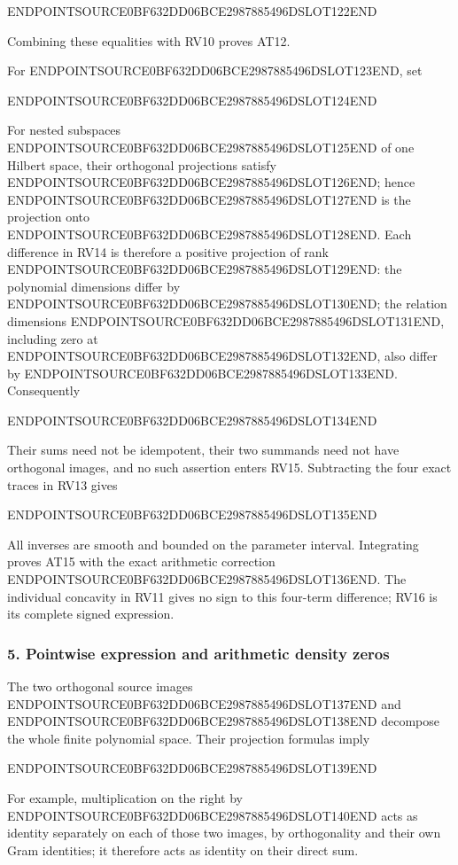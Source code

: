 ENDPOINTSOURCE0BF632DD06BCE2987885496DSLOT122END

Combining these equalities with RV10 proves AT12.

For ENDPOINTSOURCE0BF632DD06BCE2987885496DSLOT123END, set

ENDPOINTSOURCE0BF632DD06BCE2987885496DSLOT124END

For nested subspaces ENDPOINTSOURCE0BF632DD06BCE2987885496DSLOT125END of one Hilbert space, their orthogonal projections satisfy ENDPOINTSOURCE0BF632DD06BCE2987885496DSLOT126END; hence ENDPOINTSOURCE0BF632DD06BCE2987885496DSLOT127END is the projection onto ENDPOINTSOURCE0BF632DD06BCE2987885496DSLOT128END. Each difference in RV14 is therefore a positive projection of rank ENDPOINTSOURCE0BF632DD06BCE2987885496DSLOT129END: the polynomial dimensions differ by ENDPOINTSOURCE0BF632DD06BCE2987885496DSLOT130END; the relation dimensions ENDPOINTSOURCE0BF632DD06BCE2987885496DSLOT131END, including zero at ENDPOINTSOURCE0BF632DD06BCE2987885496DSLOT132END, also differ by ENDPOINTSOURCE0BF632DD06BCE2987885496DSLOT133END. Consequently

ENDPOINTSOURCE0BF632DD06BCE2987885496DSLOT134END

Their sums need not be idempotent, their two summands need not have orthogonal images, and no such assertion enters RV15. Subtracting the four exact traces in RV13 gives

ENDPOINTSOURCE0BF632DD06BCE2987885496DSLOT135END

All inverses are smooth and bounded on the parameter interval. Integrating proves AT15 with the exact arithmetic correction ENDPOINTSOURCE0BF632DD06BCE2987885496DSLOT136END. The individual concavity in RV11 gives no sign to this four-term difference; RV16 is its complete signed expression.

\subsubsection{5. Pointwise expression and arithmetic density zeros}\label{endpoint-determinant_review--pointwise-expression-and-arithmetic-density-zeros}

The two orthogonal source images ENDPOINTSOURCE0BF632DD06BCE2987885496DSLOT137END and ENDPOINTSOURCE0BF632DD06BCE2987885496DSLOT138END decompose the whole finite polynomial space. Their projection formulas imply

ENDPOINTSOURCE0BF632DD06BCE2987885496DSLOT139END

For example, multiplication on the right by ENDPOINTSOURCE0BF632DD06BCE2987885496DSLOT140END acts as identity separately on each of those two images, by orthogonality and their own Gram identities; it therefore acts as identity on their direct sum.

